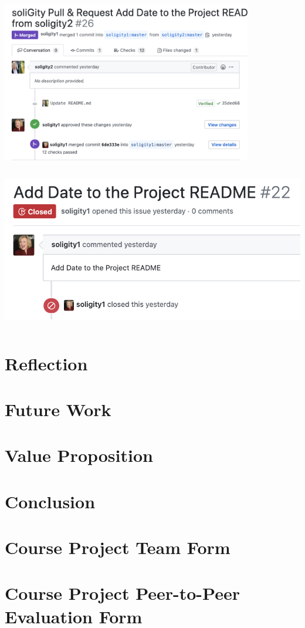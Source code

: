 \documentclass[12pt]{article}
\renewcommand{\_}{\kern-1.5pt\textunderscore\kern-1.5pt}
\begin{document}
\includegraphics[height=7cm]{graphs/44. pull_request_closed}

\includegraphics[height=7cm]{graphs/45. issue_closed}



\section{Reflection}


\section{Future Work}


\section{Value Proposition}


\section{Conclusion}

\newpage


\begingroup
\raggedright

{}

\nocite{*}

\endgroup

\newpage

\begin{appendices}

	\section{Course Project Team Form}
	\newpage

	\section{Course Project Peer-to-Peer Evaluation Form}
	\newpage

\end{appendices}
\end{document}
